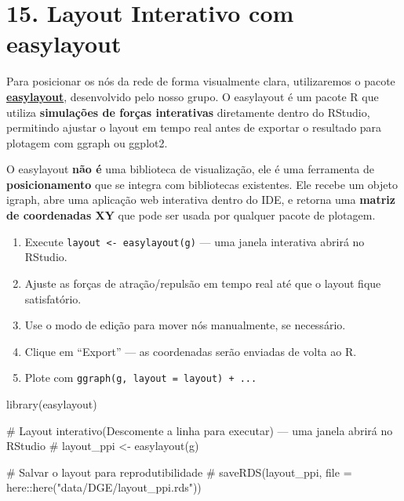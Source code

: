\documentclass[
  letterpaper,
  DIV=11,
  numbers=noendperiod]{scrreprt}
\newenvironment{Shaded}{\begin{snugshade}}{\end{snugshade}}
\newcommand{\CommentTok}[1]{\textcolor[rgb]{0.37,0.37,0.37}{#1}}
\newcommand{\FunctionTok}[1]{\textcolor[rgb]{0.28,0.35,0.67}{#1}}
\newcommand{\NormalTok}[1]{\textcolor[rgb]{0.00,0.23,0.31}{#1}}
\providecommand{\tightlist}{%
  \setlength{\itemsep}{0pt}\setlength{\parskip}{0pt}}
\begin{document}
\section{15. Layout Interativo com
easylayout}\label{layout-interativo-com-easylayout}

Para posicionar os nós da rede de forma visualmente clara, utilizaremos
o pacote
\href{https://github.com/dalmolingroup/easylayout}{\textbf{easylayout}},
desenvolvido pelo nosso grupo. O easylayout é um pacote R que utiliza
\textbf{simulações de forças interativas} diretamente dentro do RStudio,
permitindo ajustar o layout em tempo real antes de exportar o resultado
para plotagem com ggraph ou ggplot2.

O easylayout \textbf{não é} uma biblioteca de visualização, ele é uma
ferramenta de \textbf{posicionamento} que se integra com bibliotecas
existentes. Ele recebe um objeto igraph, abre uma aplicação web
interativa dentro do IDE, e retorna uma \textbf{matriz de coordenadas
XY} que pode ser usada por qualquer pacote de plotagem.

\begin{tcolorbox}[enhanced jigsaw, arc=.35mm, colframe=quarto-callout-tip-color-frame, breakable, bottomrule=.15mm, colback=white, left=2mm, titlerule=0mm, opacityback=0, title=\textcolor{quarto-callout-tip-color}{\faLightbulb}\hspace{0.5em}{Usando o easylayout na prática}, leftrule=.75mm, colbacktitle=quarto-callout-tip-color!10!white, bottomtitle=1mm, toprule=.15mm, toptitle=1mm, rightrule=.15mm, opacitybacktitle=0.6, coltitle=black]

\begin{enumerate}
\def\labelenumi{\arabic{enumi}.}
\tightlist
\item
  Execute \texttt{layout\ \textless{}-\ easylayout(g)} --- uma janela
  interativa abrirá no RStudio.
\item
  Ajuste as forças de atração/repulsão em tempo real até que o layout
  fique satisfatório.
\item
  Use o modo de edição para mover nós manualmente, se necessário.
\item
  Clique em ``Export'' --- as coordenadas serão enviadas de volta ao R.
\item
  Plote com \texttt{ggraph(g,\ layout\ =\ layout)\ +\ ...}
\end{enumerate}

\end{tcolorbox}

\begin{Shaded}
\begin{Highlighting}[]
\FunctionTok{library}\NormalTok{(easylayout)}

\CommentTok{\# Layout interativo(Descomente a linha para executar) — uma janela abrirá no RStudio}
\CommentTok{\# layout\_ppi \textless{}{-} easylayout(g)}

\CommentTok{\# Salvar o layout para reprodutibilidade}
\CommentTok{\# saveRDS(layout\_ppi, file = here::here("data/DGE/layout\_ppi.rds"))}
\end{Highlighting}
\end{Shaded}
\end{document}
